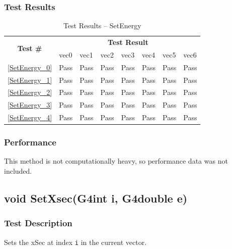 \documentclass[12pt]{article}
\begin{document}
	\subsubsection{Test Results}
		\begin{table}[H]
		\centering
		\caption{Test Results -- SetEnergy}\label{SetEnergy_acc}
		\begin{tabular}{clllllll}
		\toprule
		\multirow{2}{*}{\bf Test \#} & \multicolumn{7}{c}{\bf Test Result}\\
		& vec0 & vec1 & vec2 & vec3 & vec4 & vec5 & vec6\\\midrule
		\ref{SetEnergy_0} & Pass & Pass & Pass & Pass & Pass & Pass & Pass\\
		\ref{SetEnergy_1} & Pass & Pass & Pass & Pass & Pass & Pass & Pass\\
		\ref{SetEnergy_2} & Pass & Pass & Pass & Pass & Pass & Pass & Pass\\
		\ref{SetEnergy_3} & Pass & Pass & Pass & Pass & Pass & Pass & Pass\\
		\ref{SetEnergy_4} & Pass & Pass & Pass & Pass & Pass & Pass & Pass\\
		\bottomrule
		\end{tabular}
		\end{table}

	\subsubsection{Performance}
		This method is not computationally heavy, so performance data was not included.

\subsection{void SetXsec(G4int i, G4double e)} %
	\subsubsection{Test Description}
	Sets the xSec at index \texttt{i} in the current vector. 
	
\end{document}
